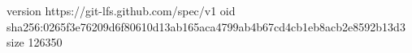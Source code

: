 version https://git-lfs.github.com/spec/v1
oid sha256:0265f3e76209d6f80610d13ab165aca4799ab4b67cd4cb1eb8acb2e8592b13d3
size 126350
